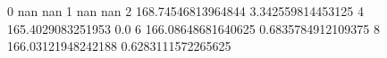 0 nan nan
1 nan nan
2 168.74546813964844 3.342559814453125
4 165.4029083251953 0.0
6 166.08648681640625 0.6835784912109375
8 166.03121948242188 0.6283111572265625
